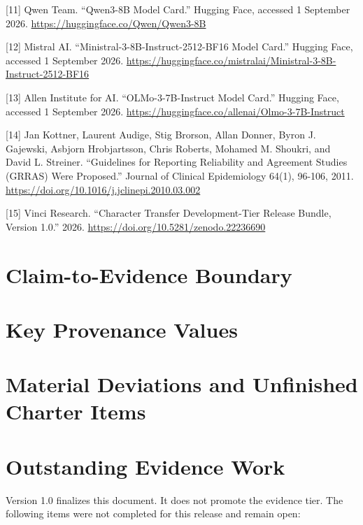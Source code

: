 \documentclass[9pt,letterpaper,twocolumn]{extarticle}
\begin{document}
{[}11{]} Qwen Team. ``Qwen3-8B Model Card.'' Hugging Face, accessed 1
September 2026. \url{https://huggingface.co/Qwen/Qwen3-8B}

{[}12{]} Mistral AI. ``Ministral-3-8B-Instruct-2512-BF16 Model Card.''
Hugging Face, accessed 1 September 2026.
\url{https://huggingface.co/mistralai/Ministral-3-8B-Instruct-2512-BF16}

{[}13{]} Allen Institute for AI. ``OLMo-3-7B-Instruct Model Card.''
Hugging Face, accessed 1 September 2026.
\url{https://huggingface.co/allenai/Olmo-3-7B-Instruct}

{[}14{]} Jan Kottner, Laurent Audige, Stig Brorson, Allan Donner, Byron
J. Gajewski, Asbjorn Hrobjartsson, Chris Roberts, Mohamed M. Shoukri,
and David L. Streiner. ``Guidelines for Reporting Reliability and
Agreement Studies (GRRAS) Were Proposed.'' Journal of Clinical
Epidemiology 64(1), 96-106, 2011.
\url{https://doi.org/10.1016/j.jclinepi.2010.03.002}

{[}15{]} Vinci Research. ``Character Transfer Development-Tier Release
Bundle, Version 1.0.'' 2026.
\url{https://doi.org/10.5281/zenodo.22236690}

\clearpage
\onecolumn
\appendix

\section{Claim-to-Evidence Boundary}\label{claim-to-evidence-boundary}



\section{Key Provenance Values}\label{key-provenance-values}



\section{Material Deviations and Unfinished Charter
Items}\label{material-deviations-and-unfinished-charter-items}



\section{Outstanding Evidence Work}\label{outstanding-evidence-work}

Version 1.0 finalizes this document. It does not promote the evidence
tier. The following items were not completed for this release and remain
open:
\end{document}
